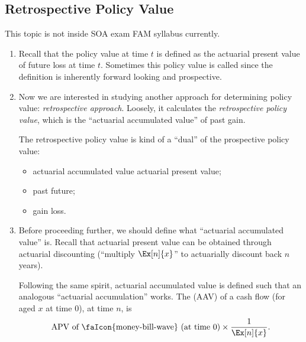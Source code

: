 \subsection{Retrospective Policy Value}
\begin{note}
This topic is not inside SOA exam FAM syllabus currently.
\end{note}
\begin{enumerate}
\item Recall that the policy value at time \(t\) is defined as the actuarial
present value of future loss at time \(t\). Sometimes this policy value is
called  since the definition is inherently
forward looking and prospective.

\item Now we are interested in studying another approach for determining policy
value: \emph{retrospective approach}. Loosely, it calculates the
\emph{retrospective policy value}, which is the ``actuarial accumulated value''
of past gain.

\begin{note}
The retrospective policy value is kind of a ``dual'' of the prospective policy value:
\begin{itemize}
\item actuarial accumulated value  actuarial present value;

\item past  future;

\item gain  loss.
\end{itemize}
\end{note}

\item Before proceeding further, we should define what ``actuarial accumulated
value'' is. Recall that actuarial present value can be obtained through
actuarial discounting (``multiply \(\Ex[n]{x}\)'' to actuarially discount back
\(n\) years).

Following the same spirit, actuarial accumulated value is defined such that an
analogous ``actuarial accumulation'' works. The  (AAV) of a cash flow  (for  aged
\(x\) at time 0), at time \(n\), is
\[
\text{APV of \faIcon{money-bill-wave} (at time 0)}\times\frac{1}{\Ex[n]{x}}.
\]
\begin{center}
\end{center}


\end{enumerate}
